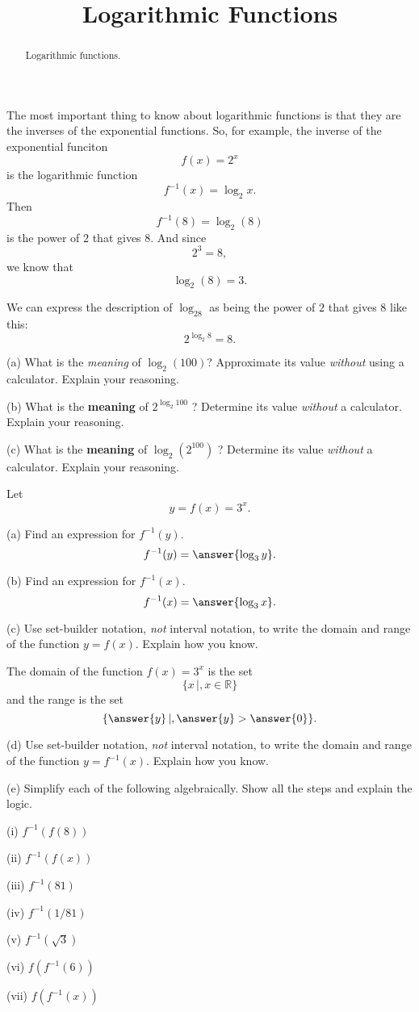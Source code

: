 \documentclass{ximera}
\title{Logarithmic Functions}
\begin{document}
\begin{abstract}
Logarithmic functions.
\end{abstract}
\maketitle


The most important thing to know about logarithmic functions is that they are the inverses of the exponential functions. So, for example, the inverse of the exponential funciton
\[
    f(x) = 2^x
\]
is the logarithmic function 
\[
   f^{-1}(x) = \log_2 x.
\]
Then 
\[
    f^{-1}(8) = \log_2 (8)    
\]
is the power of $2$ that gives $8$. And since
\[
   2^3 = 8 ,
\]
we know that
\[
   \log_2(8) = 3 .
\]

We can express the description of $\log_28$ as being the power of $2$ that gives $8$ like this:
\[
   2^{\log_2 8} = 8.
\]

\begin{question}    \label{Ex0:LogF}
(a) What is the \emph{meaning} of $\log_2(100)$? Approximate its value \emph{without} using a calculator. Explain your reasoning.

(b) What is the {\bf meaning} of $2^{\log_2 100}$ ? Determine its value \emph{without} a calculator. Explain your reasoning.

(c) What is the {\bf meaning} of $\log_2 (2^{100})$ ? Determine its value \emph{without} a calculator. Explain your reasoning.

\end{question}


\begin{question}  \label{Q1:LogF}
Let 
\[
   y =  f(x) = 3^x .
\]

(a) Find an expression for $f^{-1}(y)$.
\[
      f^{-1}(y) = \answer{\log_3 y}.
\]

(b) Find an expression for $f^{-1}(x)$.
\[
   f^{-1}(x) = \answer{\log_3 x}.
\]

(c) Use set-builder notation, \emph{not} interval notation, to write the domain and range of the function $y=f(x)$. Explain how  you know.

The domain of the function $f(x) = 3^x$ is the set
\[
   \{   x \, | , x\in \mathbb{R}  \}
\]
and the range is the set
\[
    \{   \answer{y} \, | , \answer{y} > \answer{0}  \} .
\]

(d) Use set-builder notation, \emph{not} interval notation, to write the domain and range of the function $y=f^{-1}(x)$. Explain how  you know.

(e) Simplify each of the following algebraically. Show all the steps and explain the logic.

(i) $f^{-1}(f(8))$

(ii)  $f^{-1}(f(x))$

(iii) $f^{-1}(81)$

(iv) $f^{-1}(1/81)$

(v) $f^{-1} (\sqrt{3})$

(vi) $f(f^{-1}(6))$

(vii) $f(f^{-1}(x))$


\end{question}
\end{document}
